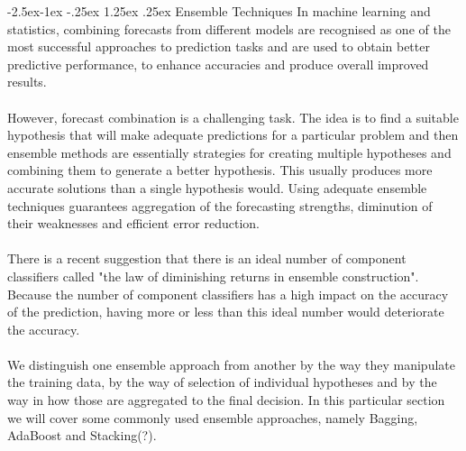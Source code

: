 \documentclass[runningheads,a4paper]{llncs}[2015/06/24]
\makeatletter
\renewcommand\paragraph{\@startsection{paragraph}{4}{\z@}%
            {-2.5ex\@plus -1ex \@minus -.25ex}%
            {1.25ex \@plus .25ex}%
            {\normalfont\normalsize\bfseries}}
\makeatother
\begin{document}
		 \paragraph{Ensemble Techniques}
In machine learning and statistics, combining forecasts from different models are recognised as one of the most successful approaches to prediction tasks and are used to obtain better predictive performance, to enhance accuracies and produce overall improved results. 
\\\\However, forecast combination is a challenging task. 
The idea is to find a suitable hypothesis that will make adequate predictions for a particular problem and then ensemble methods are essentially strategies for creating multiple hypotheses and combining them to generate a better hypothesis. This usually produces more accurate solutions than a single hypothesis would. Using adequate ensemble techniques guarantees aggregation of the forecasting strengths, diminution of their weaknesses and efficient error reduction.\\\\There is a recent suggestion that there is an ideal number of component classifiers called "the law of diminishing returns in ensemble construction". 
Because the number of component classifiers has a high impact on the accuracy of the prediction, having more or less than this ideal number would deteriorate the accuracy. \\\\We distinguish one ensemble approach from another by the way they manipulate the training data, by the way of selection of individual hypotheses and by the way in how those are aggregated to the final decision. 
In this particular section we will cover some commonly used ensemble approaches, namely Bagging, AdaBoost and Stacking(?).
\end{document}
